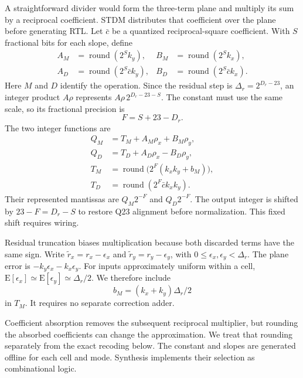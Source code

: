 \documentclass[conference]{IEEEtran}
\begin{document}
A straightforward divider would form the three-term plane and multiply its
sum by a reciprocal coefficient. STDM distributes that coefficient over the
plane before generating RTL. Let $\bar c$ be a quantized reciprocal-square
coefficient. With $S$ fractional bits for each slope, define
\begin{equation}
\begin{aligned}
A_M&=\operatorname{round}(2^S k_y),&
B_M&=\operatorname{round}(2^S k_x),\\
A_D&=\operatorname{round}(2^S\bar c k_y),&
B_D&=\operatorname{round}(2^S\bar c k_x).
\end{aligned}
\label{eq:slopes}
\end{equation}
Here $M$ and $D$ identify the operation. Since the residual step is
$\Delta_r=2^{D_r-23}$, an integer product $A\rho$ represents
$A\rho\,2^{D_r-23-S}$. The constant must use the same scale,
so its fractional precision is
\begin{equation}
F=S+23-D_r.
\label{eq:scale}
\end{equation}
The two integer functions are
\begin{align}
Q_M&=T_M+A_M\rho_x+B_M\rho_y,\label{eq:signedmul}\\
Q_D&=T_D+A_D\rho_x-B_D\rho_y,\label{eq:signeddiv}\\
T_M&=\operatorname{round}\bigl(2^F(k_xk_y+b_M)\bigr),\nonumber\\
T_D&=\operatorname{round}(2^F\bar c k_xk_y).\nonumber
\end{align}
Their represented mantissas are $Q_M2^{-F}$ and $Q_D2^{-F}$.
The output integer is shifted by $23-F=D_r-S$ to restore Q23
alignment before normalization. This fixed shift requires wiring.

Residual truncation biases multiplication because both discarded terms have
the same sign. Write $\widetilde r_x=r_x-\epsilon_x$ and
$\widetilde r_y=r_y-\epsilon_y$, with
$0\leq\epsilon_x,\epsilon_y<\Delta_r$. The plane error is
$-k_y\epsilon_x-k_x\epsilon_y$.
For inputs approximately uniform within a cell,
$\mathrm{E}[\epsilon_x]\simeq\mathrm{E}[\epsilon_y]\simeq\Delta_r/2$.
We therefore include
\begin{equation}
b_M=(k_x+k_y)\Delta_r/2
\label{eq:bias}
\end{equation}
in $T_M$. It requires no separate correction adder.

Coefficient absorption removes the subsequent reciprocal multiplier, but
rounding the absorbed coefficients can change the approximation.
We treat that rounding separately from the exact recoding below.
The constant and slopes are generated offline for each cell and mode.
Synthesis implements their selection as combinational logic.
\end{document}
